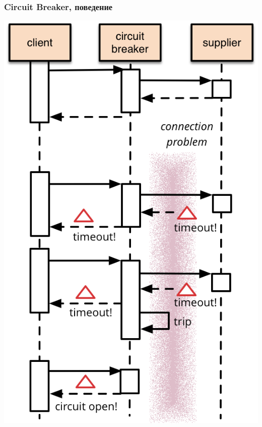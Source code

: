 \documentclass{../mcsslides}
\begin{document}
    \begin{frame}
        \frametitle{Circuit Breaker, поведение}
        \begin{center}
            \includegraphics[height=0.7\textheight]{circuitBreakerSequence.png}
        \end{center}
    \end{frame}
\end{document}
